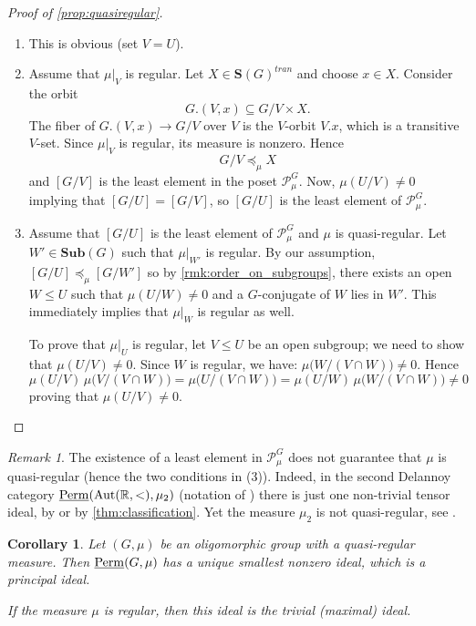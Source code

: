 \documentclass[11pt,a4paper]{amsart}
\theoremstyle{plain}%
\newtheorem{corollary}[lemma]{Corollary}
\theoremstyle{definition}
\theoremstyle{remark}
\newtheorem{remark}[lemma]{Remark}
\newcommand{\Aut}{{\operatorname{Aut}}}
\newcommand{\Perm}{\underline{{\rm Perm}}}
\newcommand{\Sub}{\mathbf{Sub}}
\newcommand{\Set}[1]{\mathbf{S}(#1)}
\begin{document}
\begin{proof}[Proof of \cref{prop:quasiregular}]

\mbox{}

\begin{enumerate}[itemindent=0pt,leftmargin=*]
    \item[(1) $\implies$ (2).] This is obvious (set $V=U$).
       \item[(2) $\implies$ (3).] 
    Assume that $\mu\rvert_V$ is regular.
Let $X\in \Set{G}^{tran}$ and choose $x\in X$. Consider the orbit
\[
  G.(V,x)\subseteq G/V\times X.
\]
The fiber of $G.(V,x)\to G/V$ over $V$ is the $V$-orbit $V.x$, which is a transitive $V$-set.  Since $\mu|_{V}$ is regular, its measure is nonzero.  Hence
\[
  G/V\preceq_\mu X
\] and $[G/V]$ is the least element in the poset $\mathcal{P}_{\mu}^G$. Now, $\mu(U/V)\neq 0$ implying that $[G/U]=[G/V]$, so $[G/U]$ is the least element of $\mathcal{P}_{\mu}^G$.



\item[(3) $\implies$ (1).] 
Assume that $[G/U]$ is the least element of $\mathcal{P}_{\mu}^G$ and $\mu$ is quasi-regular. Let $W'\in \Sub(G)$ such that $\mu\rvert_{W'}$ is regular. By our assumption, $[G/U] \preceq_{\mu} [G/W']$ so by \cref{rmk:order_on_subgroups}, there exists an open $W\leq U$ such that $\mu(U/W)\neq 0$ and a $G$-conjugate of $W$ lies in $W'$. This immediately implies that $\mu\rvert_W$ is regular as well. 


To prove that $\mu\rvert_U$ is regular, let $V\leq U$ be an open subgroup; we need to show that $\mu(U/V)\neq 0$. Since $W$ is regular, we have: $\mu\bigl(W/(V\cap W)\bigr)\neq 0$. Hence
$$\mu(U/V)\,\mu\bigl(V/(V\cap W)\bigr)=\mu\bigl(U/(V\cap W)\bigr)=\mu(U/W)\,\mu\bigl(W/(V\cap W)\bigr)\neq0 $$ 
proving that $\mu(U/V)\neq 0$.
\end{enumerate}
\end{proof}
\begin{remark}
    The existence of a least element in $\mathcal{P}_{\mu}^G$ does not guarantee that $\mu$ is quasi-regular (hence the two conditions in (3)). Indeed, in the second Delannoy category $\Perm(\Aut(\mathbb{R}, <), \mu_{2})$ (notation of \cite{CS-delannoy}) there is just one non-trivial tensor ideal, by \cite[Proposition 5.14]{CS-delannoy} or by \cref{thm:classification}. Yet the measure $\mu_2$ is not quasi-regular, see \cite[§1]{CS-delannoy}. 
\end{remark}
\begin{corollary}\label{cor:q_reg_implies_minimal_ideal}
    Let $(G, \mu)$ be an oligomorphic group with a quasi-regular measure. Then $\Perm(G, \mu)$ has a unique smallest nonzero ideal, which is a principal ideal.

    If the measure $\mu$ is regular, then this ideal is the trivial (maximal) ideal.
\end{corollary}
\end{document}
